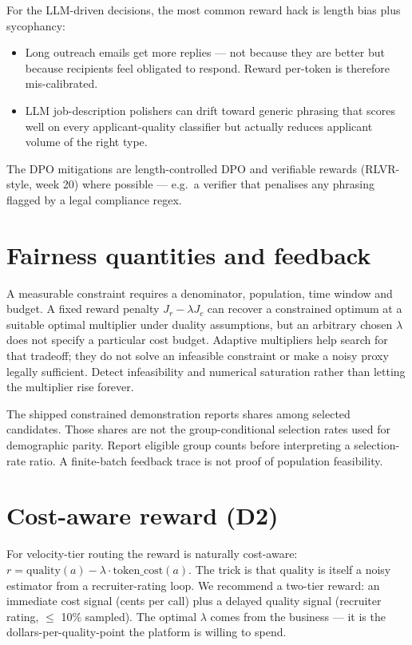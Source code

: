 \documentclass[11pt,oneside]{scrbook}
\begin{document}
For the LLM-driven decisions, the most common reward hack is length bias
plus sycophancy:

\begin{itemize}
  \item Long outreach emails get more replies --- not because they are
        better but because recipients feel obligated to respond. Reward
        per-token is therefore mis-calibrated.
  \item LLM job-description polishers can drift toward generic phrasing
        that scores well on every applicant-quality classifier but
        actually reduces applicant volume of the right type.
\end{itemize}

The DPO mitigations are length-controlled DPO and verifiable rewards
(RLVR-style, week 20) where possible --- e.g.\ a verifier that
penalises any phrasing flagged by a legal compliance regex.

\section{Fairness quantities and feedback}
A measurable constraint requires a denominator, population, time window and
budget. A fixed reward penalty $J_r-\lambda J_c$ can recover a constrained
optimum at a suitable optimal multiplier under duality assumptions, but an
arbitrary chosen $\lambda$ does not specify a particular cost budget.
Adaptive multipliers help search for that tradeoff; they do not solve an
infeasible constraint or make a noisy proxy legally sufficient. Detect
infeasibility and numerical saturation rather than letting the multiplier
rise forever.

The shipped constrained demonstration reports shares among selected
candidates. Those shares are not the group-conditional selection rates used
for demographic parity. Report eligible group counts before interpreting a
selection-rate ratio. A finite-batch feedback trace is not proof of
population feasibility.

\section{Cost-aware reward (D2)}

For velocity-tier routing the reward is naturally cost-aware:
$r = \text{quality}(a) - \lambda\cdot\text{token\_cost}(a)$.
The trick is that $\text{quality}$ is itself a noisy estimator from a
recruiter-rating loop. We recommend a two-tier reward: an immediate
cost signal (cents per call) plus a delayed quality signal
(recruiter rating, $\le$ 10\% sampled). The optimal $\lambda$ comes from
the business --- it is the dollars-per-quality-point the platform is
willing to spend.
\end{document}
